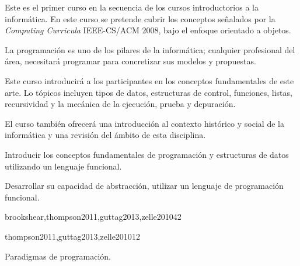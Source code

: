 \begin{syllabus}


\begin{justification}
Este es el primer curso en la secuencia de los cursos introductorios a la informática. En este curso se pretende 
cubrir los conceptos señalados por la \textit{Computing Curricula} IEEE-CS/ACM 2008, bajo el enfoque orientado a objetos.

La programación es uno de los pilares de la informática; cualquier profesional del área, necesitará programar para concretizar sus modelos y propuestas.

Este curso introducirá a los participantes en los conceptos fundamentales de este arte. Lo tópicos incluyen tipos de datos, estructuras de control, funciones, listas, recursividad y la mecánica de la ejecución, prueba y depuración.

El curso también ofrecerá una introducción al contexto histórico y social de la informática y una revisión del ámbito de esta disciplina.
\end{justification}

\begin{goals}
\item Introducir los conceptos fundamentales de programación y estructuras de datos utilizando un lenguaje funcional.
\item Desarrollar su capacidad de abstracción, utilizar un lenguaje de programación funcional.
\end{goals}

\begin{outcomes}
\end{outcomes}

\begin{unit}{\SPHistoryOfComputingDef}{brookshear,thompson2011,guttag2013,zelle2010}{4}{2}
    \SPHistoryOfComputingAllTopics
    \SPHistoryOfComputingAllObjectives
\end{unit}

\begin{unit}{\PLOverviewDef}{thompson2011,guttag2013,zelle2010}{1}{2}
   \begin{topics}
      \item \PLOverviewTopicHistory
      \item Paradigmas de programación.
   \end{topics}


\end{unit}
\end{syllabus}
